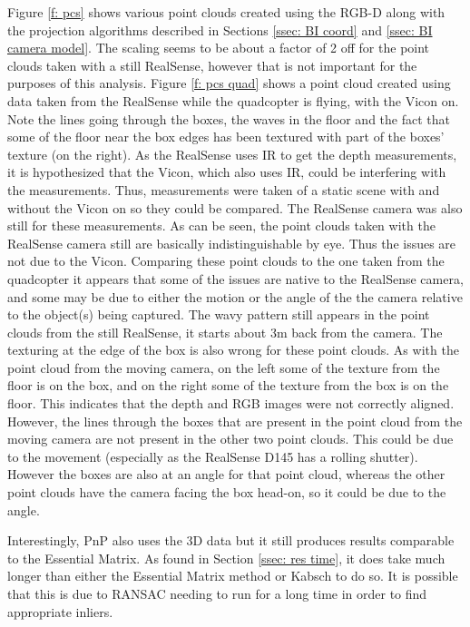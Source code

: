 \documentclass[12pt,a4paper]{article}
\begin{document}
    \noindent
    Figure \ref{f: pcs} shows various point clouds created using the RGB-D along with the projection algorithms described in Sections \ref{ssec: BI coord} and \ref{ssec: BI camera model}. The scaling seems to be about a factor of 2 off for the point clouds taken with a still RealSense, however that is not important for the purposes of this analysis. Figure \ref{f: pcs quad} shows a point cloud created using data taken from the RealSense while the quadcopter is flying, with the Vicon on. Note the lines going through the boxes, the waves in the floor and the fact that some of the floor near the box edges has been textured with part of the boxes' texture (on the right). As the RealSense uses IR to get the depth measurements, it is hypothesized that the Vicon, which also uses IR, could be interfering with the measurements. Thus, measurements were taken of a static scene with and without the Vicon on so they could be compared. The RealSense camera was also still for these measurements. As can be seen, the point clouds taken with the RealSense camera still are basically indistinguishable by eye. Thus the issues are not due to the Vicon. Comparing these point clouds to the one taken from the quadcopter it appears that some of the issues are native to the RealSense camera, and some may be due to either the motion or the angle of the the camera relative to the object(s) being captured. The wavy pattern still appears in the point clouds from the still RealSense, it starts about 3m back from the camera. The texturing at the edge of the box is also wrong for these point clouds. As with the point cloud from the moving camera, on the left some of the texture from the floor is on the box, and on the right some of the texture from the box is on the floor. This indicates that the depth and RGB images were not correctly aligned. However, the lines through the boxes that are present in the point cloud from the moving camera are not present in the other two point clouds. This could be due to the movement (especially as the RealSense D145 has a rolling shutter). However the boxes are also at an angle for that point cloud, whereas the other point clouds have the camera facing the box head-on, so it could be due to the angle. 
     
    Interestingly, PnP also uses the 3D data but it still produces results comparable to the Essential Matrix. As found in Section \ref{ssec: res time}, it does take much longer than either the Essential Matrix method or Kabsch to do so. It is possible that this is due to RANSAC needing to run for a long time in order to find appropriate inliers. 
\end{document}

